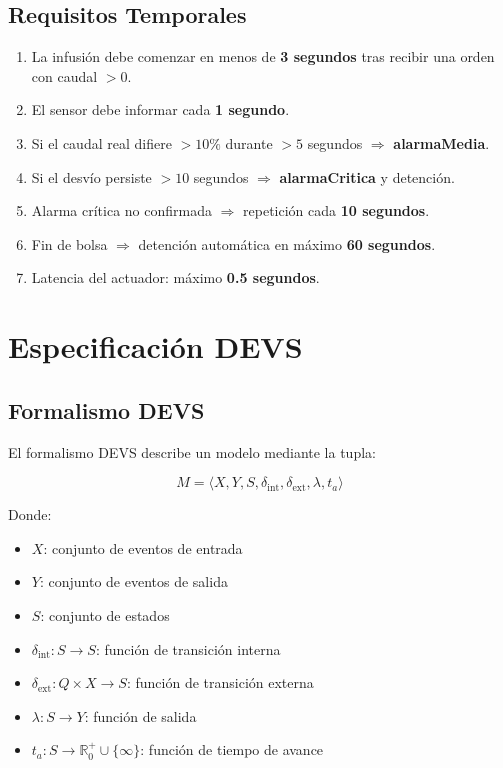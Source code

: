\documentclass[12pt,a4paper,oneside]{report}
\begin{document}
\section{Requisitos Temporales}

\begin{enumerate}
    \item La infusión debe comenzar en menos de \textbf{3 segundos} tras recibir una orden con caudal $> 0$.
    \item El sensor debe informar cada \textbf{1 segundo}.
    \item Si el caudal real difiere $> 10\%$ durante $> 5$ segundos $\Rightarrow$ \textbf{alarmaMedia}.
    \item Si el desvío persiste $> 10$ segundos $\Rightarrow$ \textbf{alarmaCritica} y detención.
    \item Alarma crítica no confirmada $\Rightarrow$ repetición cada \textbf{10 segundos}.
    \item Fin de bolsa $\Rightarrow$ detención automática en máximo \textbf{60 segundos}.
    \item Latencia del actuador: máximo \textbf{0.5 segundos}.
\end{enumerate}

\chapter{Especificación DEVS}

\section{Formalismo DEVS}

El formalismo DEVS describe un modelo mediante la tupla:

\[
M = \langle X, Y, S, \delta_{\text{int}}, \delta_{\text{ext}}, \lambda, t_a \rangle
\]

Donde:
\begin{itemize}
    \item $X$: conjunto de eventos de entrada
    \item $Y$: conjunto de eventos de salida
    \item $S$: conjunto de estados
    \item $\delta_{\text{int}} : S \to S$: función de transición interna
    \item $\delta_{\text{ext}} : Q \times X \to S$: función de transición externa
    \item $\lambda : S \to Y$: función de salida
    \item $t_a : S \to \mathbb{R}^+_0 \cup \{\infty\}$: función de tiempo de avance
\end{itemize}
\end{document}
